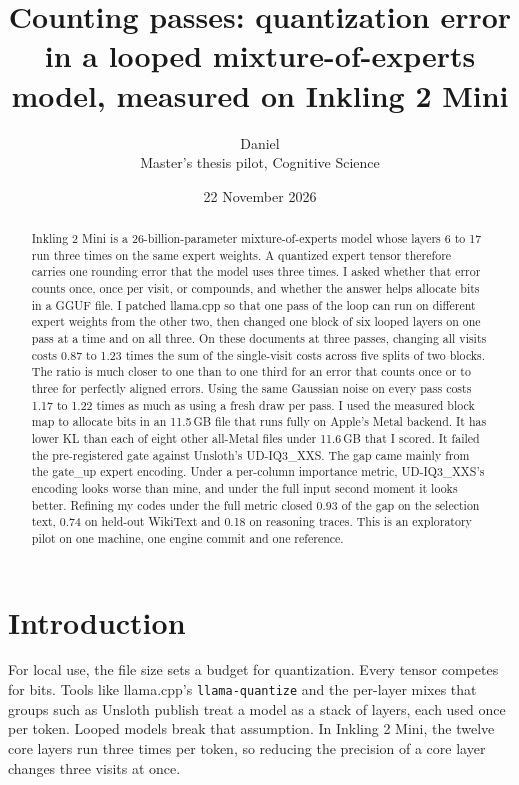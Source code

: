 \documentclass[11pt,a4paper]{article}
\title{Counting passes: quantization error in a looped mixture-of-experts model, measured on Inkling 2 Mini}
\author{Daniel\\\small Master's thesis pilot, Cognitive Science}
\date{22 November 2026}
\newcommand{\code}[1]{\texttt{#1}}
\begin{document}
\maketitle

\begin{abstract}
Inkling 2 Mini is a 26-billion-parameter mixture-of-experts model whose layers 6 to 17 run three times on the same expert weights. A quantized expert tensor therefore carries one rounding error that the model uses three times. I asked whether that error counts once, once per visit, or compounds, and whether the answer helps allocate bits in a GGUF file. I patched llama.cpp so that one pass of the loop can run on different expert weights from the other two, then changed one block of six looped layers on one pass at a time and on all three. On these documents at three passes, changing all visits costs 0.87 to 1.23 times the sum of the single-visit costs across five splits of two blocks. The ratio is much closer to one than to one third for an error that counts once or to three for perfectly aligned errors. Using the same Gaussian noise on every pass costs 1.17 to 1.22 times as much as using a fresh draw per pass. I used the measured block map to allocate bits in an 11.5\,GB file that runs fully on Apple's Metal backend. It has lower KL than each of eight other all-Metal files under 11.6\,GB that I scored. It failed the pre-registered gate against Unsloth's UD-IQ3\_XXS. The gap came mainly from the gate\_up expert encoding. Under a per-column importance metric, UD-IQ3\_XXS's encoding looks worse than mine, and under the full input second moment it looks better. Refining my codes under the full metric closed 0.93 of the gap on the selection text, 0.74 on held-out WikiText and 0.18 on reasoning traces. This is an exploratory pilot on one machine, one engine commit and one reference.
\end{abstract}

\section{Introduction}

For local use, the file size sets a budget for quantization. Every tensor competes for bits. Tools like llama.cpp's \code{llama-quantize} and the per-layer mixes that groups such as Unsloth publish treat a model as a stack of layers, each used once per token. Looped models break that assumption. In Inkling 2 Mini, the twelve core layers run three times per token, so reducing the precision of a core layer changes three visits at once.
\end{document}
